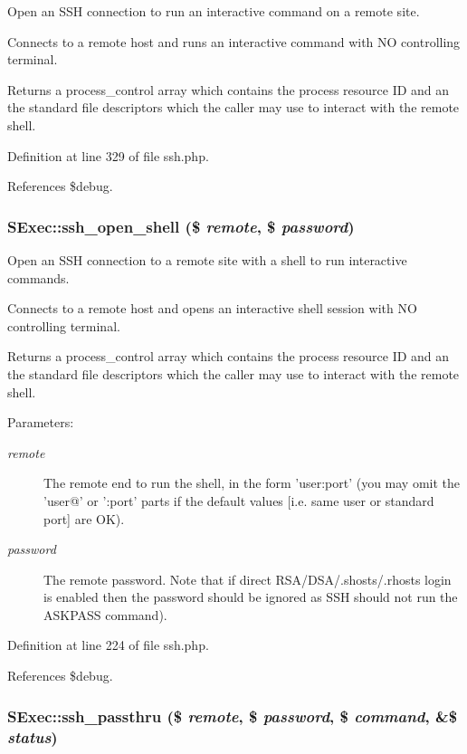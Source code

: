 Open an SSH connection to run an interactive command on a remote site. 

Connects to a remote host and runs an interactive command with NO controlling terminal.

Returns a process\_\-control array which contains the process resource ID and an the standard file descriptors which the caller may use to interact with the remote shell. 

Definition at line 329 of file ssh.php.

References \$debug.
\subsubsection{\setlength{\rightskip}{0pt plus 5cm}SExec::ssh\_\-open\_\-shell (\$ {\em remote}, \$ {\em password})}\label{classSExec_a5}


Open an SSH connection to a remote site with a shell to run interactive commands. 

Connects to a remote host and opens an interactive shell session with NO controlling terminal.

Returns a process\_\-control array which contains the process resource ID and an the standard file descriptors which the caller may use to interact with the remote shell.

\begin{Desc}
\item[Parameters:]
\begin{description}
\item[{\em remote}]The remote end to run the shell, in the form 'user:port' (you may omit the 'user@' or ':port' parts if the default values [i.e. same user or standard port] are OK). \item[{\em password}]The remote password. Note that if direct RSA/DSA/.shosts/.rhosts login is enabled then the password should be ignored as SSH should not run the ASKPASS command). \end{description}
\end{Desc}


Definition at line 224 of file ssh.php.

References \$debug.
\subsubsection{\setlength{\rightskip}{0pt plus 5cm}SExec::ssh\_\-passthru (\$ {\em remote}, \$ {\em password}, \$ {\em command}, \&\$ {\em status})}\label{classSExec_a2}


